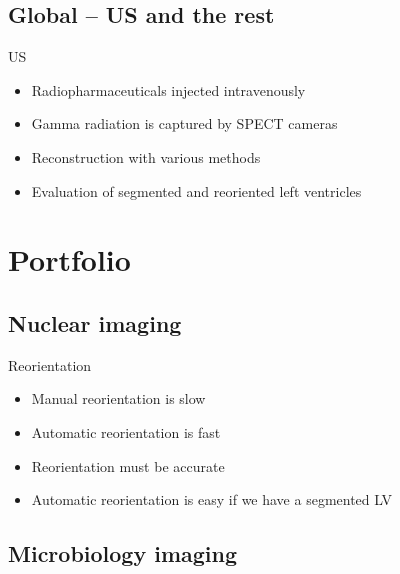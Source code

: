 \documentclass[aspectratio=169]{beamer}
\begin{document}
\subsection{Global -- US and the rest}
\begin{frame}{US}
    \begin{itemize}
        \item<1-> Radiopharmaceuticals injected intravenously
        \item<2-> Gamma radiation is captured by SPECT cameras
        \item<3-> Reconstruction with various methods
        \item<4-> Evaluation of segmented and reoriented left ventricles
    \end{itemize}
\end{frame}

\section{Portfolio}
\subsection{Nuclear imaging}
\begin{frame}{Reorientation}
    \begin{itemize}
        \item<1->Manual reorientation is slow
        \item<2->Automatic reorientation is fast
        \item<3->Reorientation must be accurate
        \item<4->Automatic reorientation is easy if we have a segmented LV
    \end{itemize}
\end{frame}

\subsection{Microbiology imaging}
\end{document}
